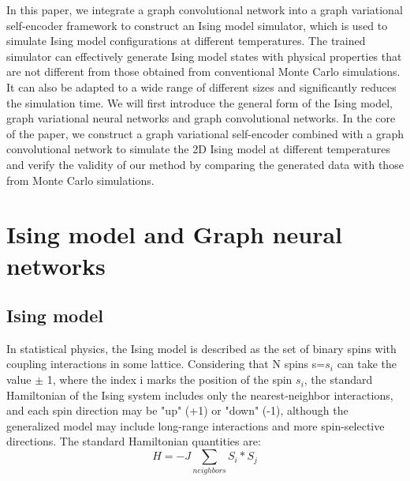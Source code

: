 \documentclass[%
reprint,
amsmath,amssymb,
aps,
]{revtex4-2}
\begin{document}
	
	In this paper, we integrate a graph convolutional network into a graph variational self-encoder framework to construct an Ising model simulator, which is used to simulate Ising model configurations at different temperatures. The trained simulator can effectively generate Ising model states with physical properties that are not different from those obtained from conventional Monte Carlo simulations. It can also be adapted to a wide range of different sizes and significantly reduces the simulation time. We will first introduce the general form of the Ising model, graph variational neural networks and graph convolutional networks. In the core of the paper, we construct a graph variational self-encoder combined with a graph convolutional network to simulate the 2D Ising model at different temperatures and verify the validity of our method by comparing the generated data with those from Monte Carlo simulations.
	
	\section{Ising model and Graph neural networks}
	
	\subsection{Ising model}
	
	In statistical physics, the Ising model is described as the set of binary spins with coupling interactions in some lattice. Considering that N spins s={$s_i$} can take the value $\pm$ 1, where the index i marks the position of the spin $s_i$, the standard Hamiltonian of the Ising system includes only the nearest-neighbor interactions, and each spin direction may be "up" (+1) or "down" (-1), although the generalized model may include long-range interactions and more spin-selective directions. The standard Hamiltonian quantities are:
    \begin{equation}\label{H}
    H = -J\sum_{neighbors}S_i*S_j
	\end{equation}
\end{document}
